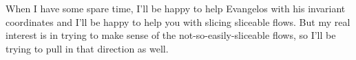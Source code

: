 \begin{description}
    When I have some spare time, I'll be happy to help Evangelos with his invariant coordinates and I'll be happy to help you with slicing sliceable flows.  But my real interest is in trying to make sense of the not-so-easily-sliceable flows, so I'll be trying to pull in that direction as well.

\end{description}

\renewcommand{\ssp}{a}
